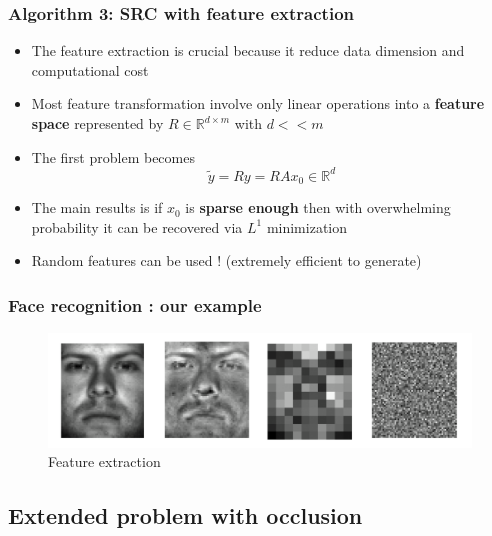 \documentclass{beamer}
\begin{document}
\begin{frame}

		\frametitle{Algorithm 3: SRC with feature extraction}		

\begin{itemize}			
\item The feature extraction is crucial because it reduce data dimension and computational cost
\item Most feature transformation involve only linear operations into a \textbf{feature space} represented by $R \in \mathbb{R}^{d \times m}$ with $d <<m$ 
\item The first problem becomes $$\widetilde{y}=Ry=RAx_{0} \in \mathbb{R}^{d}$$
\item The main  results is if $x_{0}$ is \textbf{sparse enough} then with overwhelming probability it can be recovered via $L^{1}$ minimization
\item Random features can be used ! (extremely efficient to generate)
\end{itemize}

\end{frame}


\begin{frame}
\frametitle{Face recognition : our example}

			\begin{figure}[!ht]
			\begin{center}
			\includegraphics[scale=0.2]{feature_reduc.png}
			\end{center}
			\caption{Feature extraction}
			\label{fa}
			\end{figure}
\end{frame}


\subsection{Extended problem with occlusion}
\end{document}
